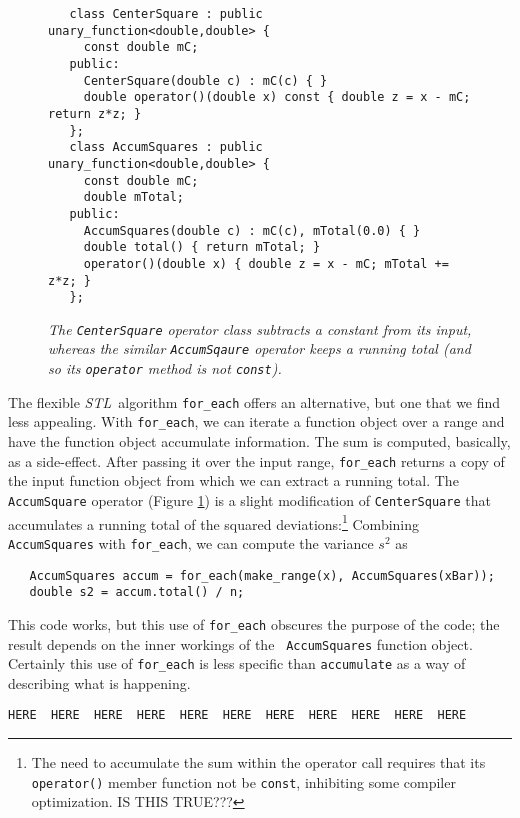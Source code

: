 \documentclass[12pt]{article}
\newcommand{\stl}{{\it STL}}
\begin{document}
\begin{figure}
\caption{ \label{fi:CenterSquare}
\it The {\tt CenterSquare} operator class subtracts a constant from
its input, whereas the similar {\tt AccumSqaure} operator keeps a
running total (and so its {\tt operator} method is not {\tt const}).}
\begin{verbatim}
   class CenterSquare : public unary_function<double,double> {
     const double mC;
   public:
     CenterSquare(double c) : mC(c) { }
     double operator()(double x) const { double z = x - mC; return z*z; }
   };
   class AccumSquares : public unary_function<double,double> {
     const double mC;
     double mTotal;
   public:
     AccumSquares(double c) : mC(c), mTotal(0.0) { }
     double total() { return mTotal; }
     operator()(double x) { double z = x - mC; mTotal += z*z; }
   };\end{verbatim}
\end{figure}


  The flexible \stl\ algorithm {\tt for\_each} offers an alternative,
but one that we find less appealing.  With {\tt for\_each}, we can
iterate a function object over a range and have the function object
accumulate information.  The sum is computed, basically, as a
side-effect. After passing it over the input range, {\tt for\_each}
returns a copy of the input function object from which we can extract
a running total. The {\tt AccumSquare} operator (Figure
\ref{fi:CenterSquare}) is a slight modification of {\tt CenterSquare}
that accumulates a running total of the squared deviations:\footnote{
The need to accumulate the sum within the operator call requires that
its {\tt operator()} member function not be {\tt const}, inhibiting
some compiler optimization.  IS THIS TRUE???}  Combining {\tt
AccumSquares} with {\tt for\_each}, we can compute the variance $s^2$
as
\begin{verbatim}
   AccumSquares accum = for_each(make_range(x), AccumSquares(xBar));
   double s2 = accum.total() / n;
\end{verbatim}
This code works, but this use of {\tt for\_each} obscures the purpose
of the code; the result depends on the inner workings of the {\tt
AccumSquares} function object.  Certainly this use of {\tt for\_each}
is less specific than {\tt accumulate} as a way of describing what is
happening.


\begin{verbatim}
HERE  HERE  HERE  HERE  HERE  HERE  HERE  HERE  HERE  HERE  HERE  
\end{verbatim}
\end{document}

